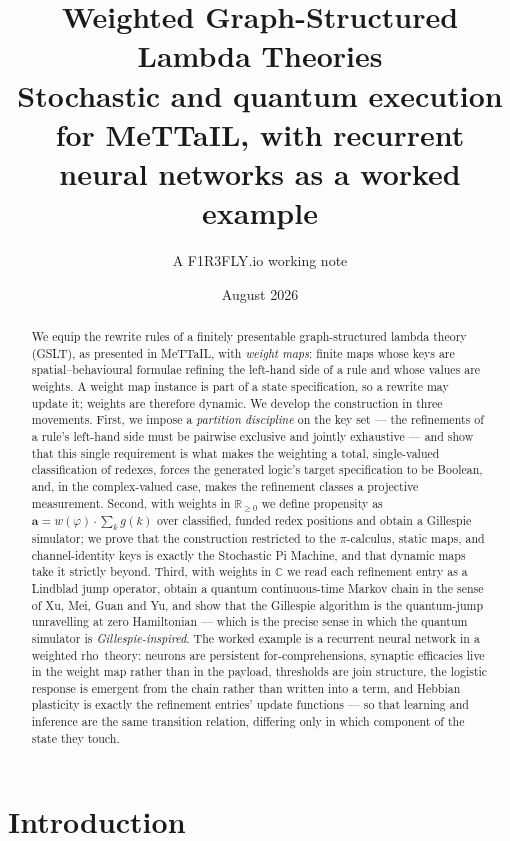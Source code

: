 \documentclass[11pt,a4paper]{article}
\title{\textbf{Weighted Graph-Structured Lambda Theories}\\[0.4em]
\large Stochastic and quantum execution for MeTTaIL, with recurrent\\
neural networks as a worked example}
\author{A F1R3FLY.io working note}
\date{August 2026}
\theoremstyle{plain}
\theoremstyle{definition}
\theoremstyle{remark}
\newcommand{\rhoc}{\textsf{rho}}
\newcommand{\Rnn}{\mathbb{R}_{\geq 0}}
\newcommand{\Cx}{\mathbb{C}}
\newcommand{\prop}{\mathbf{a}}
\newcommand{\wmap}{w}
\newcommand{\gfac}{g}
\begin{document}
\maketitle

\begin{abstract}
We equip the rewrite rules of a finitely presentable graph-structured lambda theory (GSLT), as
presented in MeTTaIL, with \emph{weight maps}: finite maps whose keys are spatial--behavioural
formulae refining the left-hand side of a rule and whose values are weights. A weight map instance
is part of a state specification, so a rewrite may update it; weights are therefore dynamic. We
develop the construction in three movements. First, we impose a \emph{partition discipline} on the
key set --- the refinements of a rule's left-hand side must be pairwise exclusive and jointly
exhaustive --- and show that this single requirement is what makes the weighting a total,
single-valued classification of redexes, forces the generated logic's target specification to be
Boolean, and, in the complex-valued case, makes the refinement classes a projective measurement.
Second, with weights in $\Rnn$ we define propensity as
$\prop = \wmap(\varphi)\cdot\sum_k \gfac(k)$ over classified, funded redex positions and obtain a
Gillespie simulator; we prove that the construction restricted to the $\pi$-calculus, static maps,
and channel-identity keys is exactly the Stochastic Pi Machine, and that dynamic maps take it
strictly beyond. Third, with weights in $\Cx$ we read each refinement entry as a Lindblad jump
operator, obtain a quantum continuous-time Markov chain in the sense of Xu, Mei, Guan and Yu, and
show that the Gillespie algorithm is the quantum-jump unravelling at zero Hamiltonian --- which is
the precise sense in which the quantum simulator is \emph{Gillespie-inspired}. The worked example is
a recurrent neural network in a weighted \rhoc\ theory: neurons are persistent for-comprehensions,
synaptic efficacies live in the weight map rather than in the payload, thresholds are join
structure, the logistic response is emergent from the chain rather than written into a term, and
Hebbian plasticity is exactly the refinement entries' update functions --- so that learning and
inference are the same transition relation, differing only in which component of the state they
touch.
\end{abstract}

\tableofcontents

\section{Introduction}
\label{sec:intro}
\end{document}
